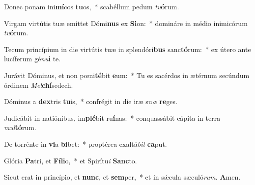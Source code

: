 ﻿\setcounter{versecount}{2}

\vs Donec ponam ini\textbf{mí}cos \textbf{tu}os,~* scabéllum pedum \textit{tu}\textbf{ó}rum.

\vs Virgam virtútis tuæ emíttet Dó\-mi\-\textbf{nus} ex \textbf{Si}on:~* domináre in médio inimicórum \textit{tu}\textbf{ó}rum.

\vs Tecum princípium in die virtútis tuæ in splendóri\textbf{bus} sanc\textbf{tó}rum:~* ex útero ante lucíferum gé\textit{nu}\textbf{i} te.

\vs Jurávit Dóminus, et non pœni\textbf{té}bit \textbf{e}um:~* Tu es sacérdos in ætérnum secúndum órdinem \textit{Mel}\textbf{chí}sedech.

\vs Dóminus a \textbf{dex}tris \textbf{tu}is,~* confrégit in die iræ su\textit{æ} \textbf{re}ges.

\vs Judicábit in natiónibus, im\textbf{plé}bit ru\textbf{í}nas:~* conquassábit cápita in terra \textit{mul}\textbf{tó}rum.

\vs De torrénte in \textbf{vi}a \textbf{bi}bet:~* proptérea exaltá\textit{bit} \textbf{ca}put.

\vs Glória \textbf{Pa}tri, et \textbf{Fí}\textbf{li}o,~* et Spirítu\textit{i} \textbf{Sanc}to.

\vs Sicut erat in princípio, et \textbf{nunc}, et \textbf{sem}per,~* et in sǽcula sæculó\textit{rum}. \textbf{A}men.

